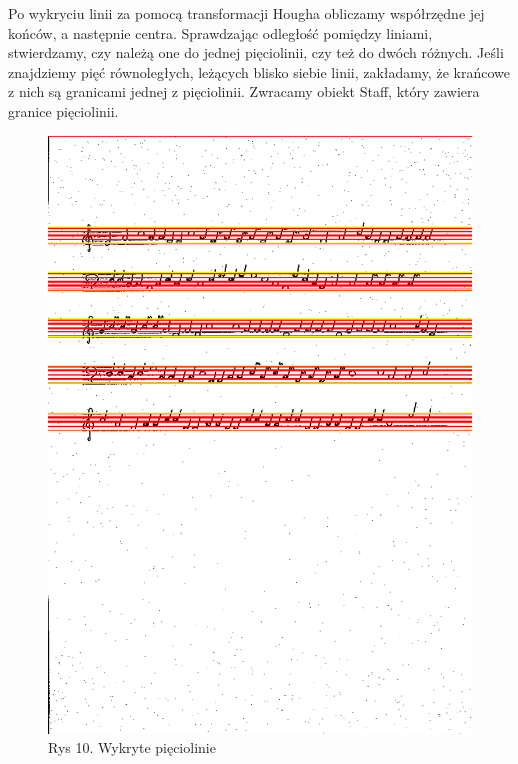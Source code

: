 \documentclass[11pt]{article}
\begin{document}
Po wykryciu linii za pomocą transformacji Hougha obliczamy współrzędne jej końców, a następnie centra.
Sprawdzając odległość pomiędzy liniami, stwierdzamy, czy należą one do jednej pięciolinii, czy też do dwóch różnych.
Jeśli znajdziemy pięć równoległych, leżących blisko siebie linii, zakładamy, że krańcowe z nich są granicami jednej z pięciolinii. 
Zwracamy obiekt Staff, który zawiera granice pięciolinii.

\captionsetup[figure]{labelformat=empty}
\begin{figure}[h!]
    \centering
    \graphicspath{ {staffs/} }
    \includegraphics[scale=0.15]{staffs4_done.png}
    \caption{Rys 10. Wykryte pięciolinie}
    \label{fig:universe}
    \end{figure}
\end{document}
